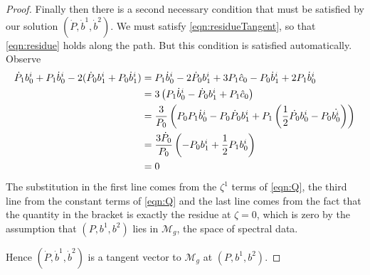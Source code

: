 \documentclass{article}
\begin{document}
\begin{lem}[Case (i)]
\begin{proof}
Finally then there is a second necessary condition that must be satisfied by our solution $(\dot{P},\dot{b}^1,\dot{b}^2)$. We must satisfy \eqref{eqn:residueTangent}, so that \eqref{eqn:residue} holds along the path. But this condition is satisfied automatically. Observe
\begin{align*}
\dot{P}_1 b^i_0 + P_1 \dot{b}^i_0 - 2(\dot{P}_0 b^i_1 + P_0 \dot{b}^i_1)
&= P_1\dot{b}^i_0 - 2\dot{P}_0b^i_1 + 3P_1\hat{c}_0 - P_0\dot{b}^i_1 + 2P_1\dot{b}^i_0 \\
&= 3\left( P_1\dot{b}^i_0 - \dot{P}_0b^i_1 + P_1\hat{c}_0\right) \\
&= \frac{3}{P_0}\left( P_0P_1\dot{b}^i_0 - P_0\dot{P}_0b^i_1 + P_1\left( \frac{1}{2}\dot{P_0}b^i_0 - P_0\dot{b^i_0} \right)\right) \\
&= \frac{3\dot{P}_0}{P_0}\left( - P_0b^i_1 + \frac{1}{2}P_1b^i_0 \right)\\
&= 0
\end{align*}
The substitution in the first line comes from the $\zeta^1$ terms of \eqref{eqn:Q}, the third line from the constant terms of \eqref{eqn:Q} and the last line comes from the fact that the quantity in the bracket is exactly the residue at $\zeta=0$, which is zero by the assumption that $(P,b^1,b^2)$ lies in $\mathcal{M}_g$, the space of spectral data.

Hence $(\dot{P},\dot{b}^1,\dot{b}^2)$ is a tangent vector to $\mathcal{M}_g$ at $(P,b^1,b^2)$.
\end{proof}
\end{lem}
\end{document}
